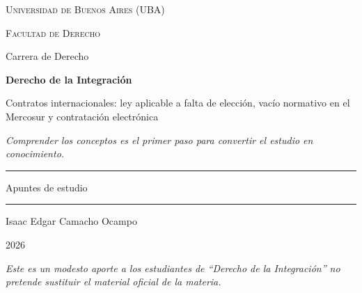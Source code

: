\documentclass[12pt,oneside]{book}
\newcommand{\universidad}{Universidad de Buenos Aires (UBA)}
\newcommand{\facultad}{Facultad de Derecho}
\newcommand{\carrera}{Carrera de Derecho}
\newcommand{\materia}{Derecho de la Integración}
\newcommand{\titulo}{Contratos internacionales: ley aplicable a falta de elección, vacío normativo en el Mercosur y contratación electrónica}
\newcommand{\autor}{Isaac Edgar Camacho Ocampo}
\newcommand{\anio}{2026}
\begin{document}
\begin{titlepage}

\thispagestyle{empty}

\begin{center}

\vspace*{1cm}

{\large \textsc{\universidad}}

\vspace{0.2cm}

{\large \textsc{\facultad}}

\vspace{0.2cm}

{\large \carrera}

\vspace{2.5cm}

{\Huge \textbf{\materia}}

\vspace{1cm}

{\LARGE \titulo}

\vspace{0.8cm}

\textit{Comprender los conceptos es el primer paso para convertir el estudio en conocimiento.}

\vspace{1.2cm}

\rule{0.70\textwidth}{0.5pt}

\vspace{0.5cm}

{\large Apuntes de estudio}

\vspace{0.5cm}

\rule{0.70\textwidth}{0.5pt}

\vfill

{\large \autor}

\vspace{0.3cm}

{\large \anio}

\end{center}

\vfill

\begin{flushleft}
\textit{Este es un modesto aporte a los estudiantes de ``\materia'' no pretende sustituir el material oficial de la materia.}
\end{flushleft}

\end{titlepage}
\end{document}
